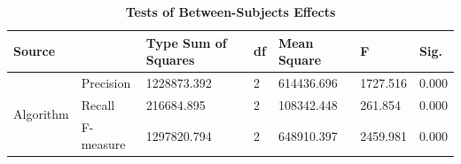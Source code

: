 \documentclass{ieeeaccess}
\begin{document}
\begin{table}[!h]
\centering
\caption{\textbf{Tests of Between-Subjects Effects}}
\label{tab:t8}
\setlength{\tabcolsep}{0.5pt}
\begin{tabular}{|l|l|l|l|l|l|l|} 
\hline
\multicolumn{2}{|l|}{Source}           & Type Sum of Squares & df & Mean Square & F        & Sig.   \\ 
\hline
\multirow{3}{*}{Algorithm} & Precision & 1228873.392         & 2  & 614436.696  & 1727.516 & 0.000  \\
                           & Recall    & 216684.895          & 2  & 108342.448  & 261.854  & 0.000  \\
                           & F-measure & 1297820.794         & 2  & 648910.397  & 2459.981 & 0.000  \\
\hline
\end{tabular}
\end{table}
\end{document}
